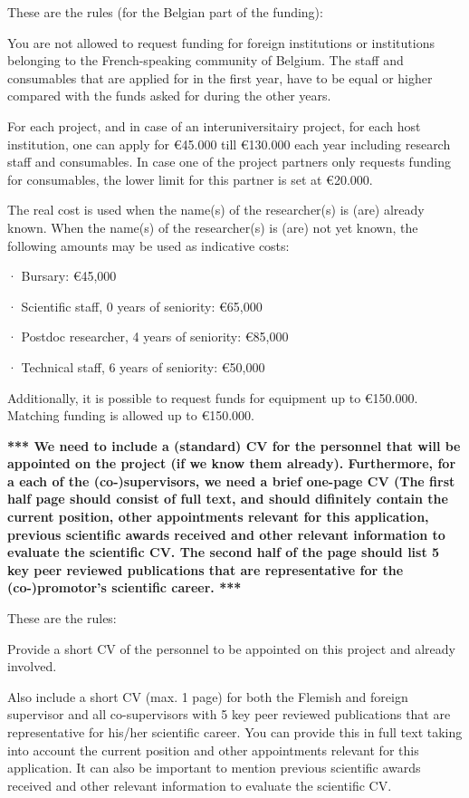 \documentclass[11pt,dvipsnames,usenames,a4paper]{article}
\begin{document}
{\color{Gray}These are the rules (for the Belgian part of the funding):

You are not allowed to request funding for foreign institutions or institutions belonging to the French-speaking community of Belgium. The staff and consumables that are applied for in the first year, have to be equal or higher compared with the funds asked for during the other years. 

For each project, and in case of an interuniversitairy project, for each host institution, one can apply for €45.000 till €130.000 each year including research staff and consumables. In case one of the project partners only requests funding for consumables, the lower limit for this partner is set at €20.000. 

The real cost is used when the name(s) of the researcher(s) is (are) already known. When the name(s) of the researcher(s) is (are) not yet known, the following amounts may be used as indicative costs:

·         Bursary: €45,000

·         Scientific staff, 0 years of seniority: €65,000

·         Postdoc researcher, 4 years of seniority: €85,000

·         Technical staff, 6 years of seniority: €50,000


Additionally, it is possible to request funds for equipment up to €150.000. Matching funding is allowed up to €150.000.
}


{\bf\color{blue}*** We need to include a (standard) CV for the personnel that will be appointed on the project (if we know them already). Furthermore, for a each of the (co-)supervisors, we need a brief one-page CV (The first half page should consist of full text, and should difinitely contain the current position, other appointments relevant for this application, previous scientific awards received and other relevant information to evaluate the scientific CV. The second half of the page should list 5 key peer reviewed publications that are representative for the (co-)promotor's scientific career. ***}

{\color{Gray}
These are the rules:

Provide a short CV of the personnel to be appointed on this project and already involved. 

Also include a short CV (max. 1 page) for both the Flemish and foreign supervisor and all co-supervisors with 5 key peer reviewed publications that are representative for his/her scientific career. You can provide this in full text taking into account the current position and other appointments relevant for this application. It can also be important to mention previous scientific awards received and other relevant information to evaluate the scientific CV.}\\
\end{document}
